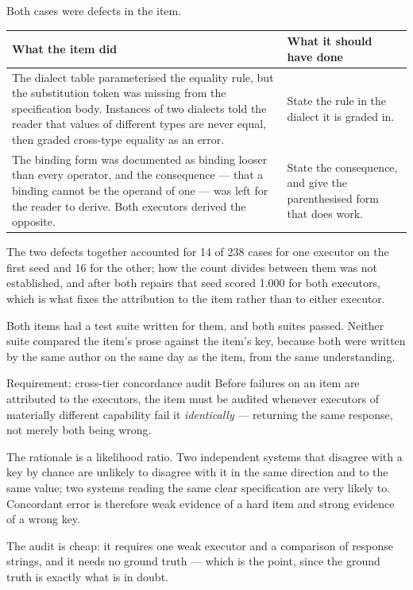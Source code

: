 \documentclass[11pt]{article}
\theoremstyle{definition}
\begin{document}
Both cases were defects in the item.

\begin{table}[h]
\centering\small
\begin{tabularx}{\textwidth}{@{}YY@{}}
\toprule
What the item did & What it should have done \\
\midrule
The dialect table parameterised the equality rule, but the substitution token was missing from the specification body. Instances of two dialects told the reader that values of different types are never equal, then graded cross-type equality as an error. & State the rule in the dialect it is graded in. \\
\addlinespace
The binding form was documented as binding looser than every operator, and the consequence --- that a binding cannot be the operand of one --- was left for the reader to derive. Both executors derived the opposite. & State the consequence, and give the parenthesised form that does work. \\
\bottomrule
\end{tabularx}
\end{table}

The two defects together accounted for 14 of 238 cases for one executor on the first seed and 16 for the other; how the count divides between them was not established, and after both repairs that seed scored 1.000 for both executors, which is what fixes the attribution to the item rather than to either executor.

Both items had a test suite written for them, and both suites passed. Neither suite compared the item's prose against the item's key, because both were written by the same author on the same day as the item, from the same understanding.

\begin{claimbox}{Requirement: cross-tier concordance audit}
Before failures on an item are attributed to the executors, the item must be audited whenever executors of materially different capability fail it \emph{identically} --- returning the same response, not merely both being wrong.

The rationale is a likelihood ratio. Two independent systems that disagree with a key by chance are unlikely to disagree with it in the same direction and to the same value; two systems reading the same clear specification are very likely to. Concordant error is therefore weak evidence of a hard item and strong evidence of a wrong key.

The audit is cheap: it requires one weak executor and a comparison of response strings, and it needs no ground truth --- which is the point, since the ground truth is exactly what is in doubt.
\end{claimbox}
\end{document}
